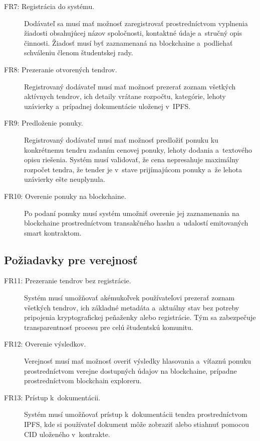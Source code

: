 \begin{description}
    \item[FR7: Registrácia do systému.] Dodávateľ sa musí mať možnosť
    zaregistrovať prostredníctvom vyplnenia žiadosti obsahujúcej názov
    spoločnosti, kontaktné údaje a~stručný opis činnosti. Žiadosť
    musí byť zaznamenaná na blockchaine a~podliehať schváleniu
    členom študentskej rady.

    \item[FR8: Prezeranie otvorených tendrov.] Registrovaný dodávateľ
    musí mať možnosť prezerať zoznam všetkých aktívnych tendrov,
    ich detaily vrátane rozpočtu, kategórie, lehoty uzávierky
    a~prípadnej dokumentácie uloženej v~IPFS.

    \item[FR9: Predloženie ponuky.] Registrovaný dodávateľ musí mať
    možnosť predložiť ponuku ku konkrétnemu tendru zadaním cenovej
    ponuky, lehoty dodania a~textového opisu riešenia. Systém musí
    validovať, že cena nepresahuje maximálny rozpočet tendra, že
    tender je v~stave prijímajúcom ponuky a~že lehota uzávierky
    ešte neuplynula.

    \item[FR10: Overenie ponuky na blockchaine.] Po podaní ponuky musí
    systém umožniť overenie jej zaznamenania na blockchaine
    prostredníctvom transakčného hashu a~udalostí emitovaných smart
    kontraktom.
\end{description}

\subsection{Požiadavky pre verejnosť}
\label{subsec:fr_public}

\begin{description}
    \item[FR11: Prezeranie tendrov bez registrácie.] Systém musí
    umožňovať akémukoľvek používateľovi prezerať zoznam všetkých
    tendrov, ich základné metadáta a~aktuálny stav bez potreby
    pripojenia kryptografickej peňaženky alebo registrácie. Tým
    sa zabezpečuje transparentnosť procesu pre celú študentskú
    komunitu.

    \item[FR12: Overenie výsledkov.] Verejnosť musí mať možnosť
    overiť výsledky hlasovania a~víťaznú ponuku prostredníctvom
    verejne dostupných údajov na blockchaine, prípadne
    prostredníctvom blockchain exploreru.

    \item[FR13: Prístup k~dokumentácii.] Systém musí umožňovať
    prístup k~dokumentácii tendra prostredníctvom IPFS, kde si
    používateľ dokument môže zobraziť alebo stiahnuť pomocou CID
    uloženého v~kontrakte.
\end{description}

